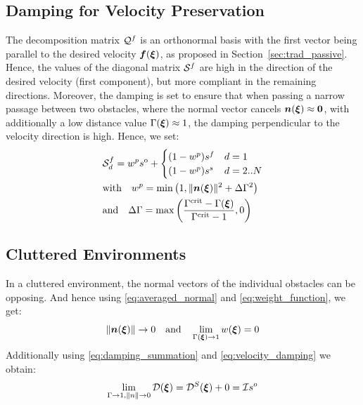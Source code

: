 \subsection{Damping for Velocity Preservation}
The decomposition matrix $\mathcal{Q}^{f}$ is an orthonormal basis with the first vector being parallel to the desired velocity $\boldsymbol{f}(\boldsymbol{\xi})$, as proposed in Section~\ref{sec:trad_passive}. Hence, the values of the diagonal matrix $\mathcal{S}^{f}$ are high in the direction of the desired velocity (first component), but more compliant in the remaining directions. 
Moreover, the damping is set to ensure that when passing a narrow passage between two obstacles, where the normal vector cancels $\boldsymbol{n}(\boldsymbol{\xi}) \approx \boldsymbol{0}$, with additionally a low distance value $\Gamma(\boldsymbol{\xi}) \approx 1$, the damping perpendicular to the velocity direction is high. Hence, we set:
\begin{equation}
  \begin{split}
  & \matd{S}^{f}_{d} =
  w^p s^{\mathrm{o}} + 
  \begin{cases}
   (1- w^p) s^f & d = 1 \\
   (1- w^p) s^s & d = 2 .. N 
  \end{cases} \\
  & \text{with} \quad
   w^p = \min \left(1,  \| \vecs n(\vecs \xi) \|^2 +  \Delta \Gamma ^2 \right) \\
   & \text{and} \quad \Delta \Gamma = \max \left(\frac{\Gamma^{\mathrm{crit}} -\Gamma(\vecs \xi)}{\Gamma^{\mathrm{crit}} - 1}, 0\right)
  \end{split}
  \label{eq:velocity_damping}
\end{equation}

\subsection{Cluttered Environments}
In a cluttered environment, the normal vectors of the individual obstacles can be opposing. And hence using \eqref{eq:averaged_normal} and \eqref{eq:weight_function}, we get: 
\begin{equation}
    \| \boldsymbol{n}(\boldsymbol{\xi}) \| \rightarrow 0
    \quad \text{and} \quad
    \lim_{\Gamma (\boldsymbol{\xi}) \rightarrow 1} w (\boldsymbol{\xi}) = 0
\end{equation}
Additionally using \eqref{eq:damping_summation} and \eqref{eq:velocity_damping} we obtain:
\begin{equation}
    \lim_{\Gamma \rightarrow 1, \| n \| \rightarrow 0} \mathcal{D}(\boldsymbol{\xi}) 
    = \mathcal{D}^S(\boldsymbol{\xi}) + 0 
    =  \mathcal{I} s^o
\end{equation}

